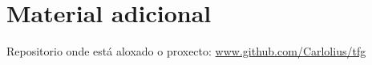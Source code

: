 \chapter{Material adicional}
\label{chap:adicional}

Repositorio onde está aloxado o proxecto: \href{https://www.github.com/Carlolius/tfg}{www.github.com/Carlolius/tfg}
